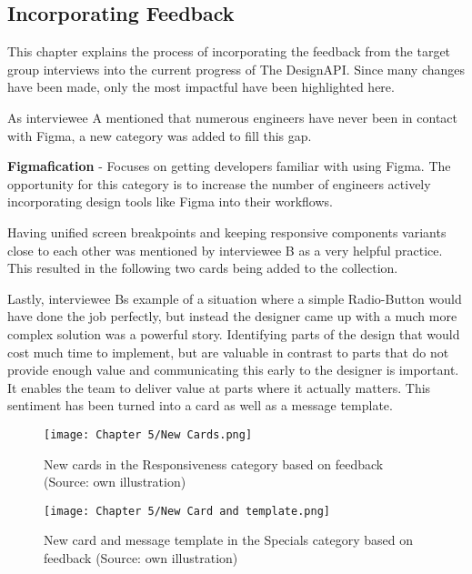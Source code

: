 \newpage
\subsection{Incorporating Feedback}
This chapter explains the process of incorporating the feedback from the target group interviews
into the current progress of The DesignAPI. Since many changes have been made, only the most impactful
have been highlighted here.

As interviewee A mentioned that numerous engineers have never been in contact with Figma, a new
category was added to fill this gap.

\textbf{Figmafication} - Focuses on getting developers familiar with using Figma. The
opportunity for this category is to increase the number of engineers actively
incorporating design tools like Figma into their workflows.

Having unified screen breakpoints and keeping responsive components variants close to each other was
mentioned by interviewee B as a very helpful practice. This resulted in the following two cards
being added to the collection.

Lastly, interviewee Bs example of a situation where a simple Radio-Button would have done the job
perfectly, but instead the designer came up with a much more complex solution was a powerful story.
Identifying parts of the design that would cost much time to implement, but are valuable in contrast
to parts that do not provide enough value and communicating this early to the designer is important.
It enables the team to deliver value at parts where it actually matters. This sentiment has been
turned into a card as well as a message template.

\begin{figure}[H]
    \centering
    \texttt{[image: Chapter 5/New Cards.png]}
    \caption{New cards in the Responsiveness category based on feedback (Source: own illustration)}
\end{figure}

\begin{figure}[H]
    \centering
    \texttt{[image: Chapter 5/New Card and template.png]}
    \caption{New card and message template in the Specials category based on feedback (Source: own illustration)}
\end{figure}
